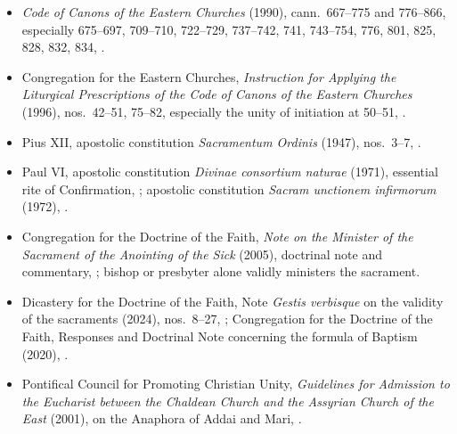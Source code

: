 {\begin{itemize}[itemsep=0.18em,topsep=0.25em]
\item \emph{Code of Canons of the Eastern Churches} (1990), cann.~667--775 and 776--866, especially 675--697, 709--710, 722--729, 737--742, 741, 743--754, 776, 801, 825, 828, 832, 834, .
\item Congregation for the Eastern Churches, \emph{Instruction for Applying the Liturgical Prescriptions of the Code of Canons of the Eastern Churches} (1996), nos.~42--51, 75--82, especially the unity of initiation at 50--51, .
\item Pius XII, apostolic constitution \emph{Sacramentum Ordinis} (1947), nos.~3--7, .
\item Paul VI, apostolic constitution \emph{Divinae consortium naturae} (1971), essential rite of Confirmation, ; apostolic constitution \emph{Sacram unctionem infirmorum} (1972), .
\item Congregation for the Doctrine of the Faith, \emph{Note on the Minister of the Sacrament of the Anointing of the Sick} (2005), doctrinal note and commentary, ; bishop or presbyter alone validly ministers the sacrament.
\item Dicastery for the Doctrine of the Faith, Note \emph{Gestis verbisque} on the validity of the sacraments (2024), nos.~8--27, ; Congregation for the Doctrine of the Faith, Responses and Doctrinal Note concerning the formula of Baptism (2020), .
\item Pontifical Council for Promoting Christian Unity, \emph{Guidelines for Admission to the Eucharist between the Chaldean Church and the Assyrian Church of the East} (2001), on the Anaphora of Addai and Mari, .

\end{itemize}}
